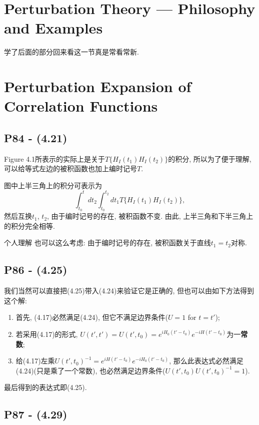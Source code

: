 \section{Perturbation Theory --- Philosophy and Examples}

学了后面的部分回来看这一节真是常看常新.

\section{Perturbation Expansion of Correlation Functions}

\subsection{P84 - (4.21)}

Figure 4.1所表示的实际上是关于$T\{H_I(t_1) H_I(t_2)\}$的积分, 所以为了便于理解, 可以给等式左边的被积函数也加上编时记号$T$.

图中上半三角上的积分可表示为
\begin{equation}
  \int_{t_0}^{t} dt_2 \int_{t_0}^{t_2} dt_1 T\{H_I(t_1) H_I(t_2)\},
\end{equation}
然后互换$t_1$, $t_2$, 由于编时记号的存在, 被积函数不变.
由此, 上半三角和下半三角上的积分完全相等.

\begin{mybox}{个人理解}
  也可以这么考虑: 由于编时记号的存在, 被积函数关于直线$t_1 = t_2$对称.
\end{mybox}

\subsection{P86 - (4.25)}

我们当然可以直接把(4.25)带入(4.24)来验证它是正确的, 但也可以由如下方法得到这个解:
\begin{enumerate}
  \item 首先, (4.17)必然满足(4.24), 但它不满足边界条件($U = 1$ for $t = t'$);
  \item 若采用(4.17)的形式, $U(t', t') = U(t', t_0) = e^{iH_0(t'-t_0)}e^{-iH(t'-t_0)}$为一\textbf{常数};
  \item 给(4.17)左乘$U(t', t_0)^{-1} = e^{iH(t'-t_0)}e^{-iH_0(t'-t_0)}$, 那么此表达式必然满足(4.24)(只是乘了一个常数), 也必然满足边界条件($U(t', t_0)U(t', t_0)^{-1} = 1$).
\end{enumerate}
最后得到的表达式即(4.25).

\subsection{P87 - (4.29)}

